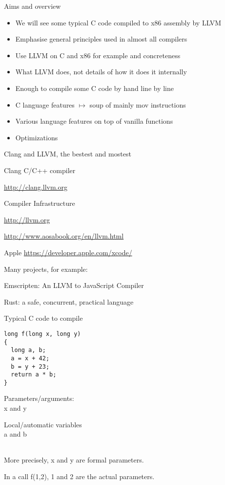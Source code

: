 \documentclass[landscape]{beamer}
\begin{document}
\begin{frame}{Aims and overview}

\begin{itemize}
\item
We will see some typical C code compiled to x86 assembly by LLVM
\item Emphasise general principles used in almost all compilers
\item Use LLVM on C and x86 for example and concreteness
\item
\alert{What} LLVM does, not details of \alert{how} it does it internally
\item
Enough to compile some C code by hand line by line
\item
C language features $\mapsto$ soup of mainly mov instructions
\item
Various language features on top of vanilla functions
\item
Optimizations

\end{itemize}

\end{frame}


\begin{frame}{Clang and LLVM, the bestest and mostest}

Clang C/C++ compiler

\url{http://clang.llvm.org}

Compiler Infrastructure

\url{http://llvm.org}

\url{http://www.aosabook.org/en/llvm.html}

Apple 
\url{https://developer.apple.com/xcode/}

Many projects, for example:

Emscripten: An LLVM to JavaScript Compiler

Rust: a safe, concurrent, practical language

\end{frame}


\begin{frame}[fragile]{Typical C code to compile}
\begin{minipage}{.5\textwidth}
\begin{verbatim}
long f(long x, long y)
{
  long a, b;
  a = x + 42;
  b = y + 23;
  return a * b;
}
\end{verbatim}
\end{minipage}
%
\begin{minipage}{.4\textwidth}
Parameters/arguments:
\\
 x and y

Local/automatic variables
\\
 a and b 
\end{minipage}
\\[4em]

More precisely, x and y are formal parameters.

In a call f(1,2), 1 and 2 are the actual parameters.

\end{frame}
\end{document}
